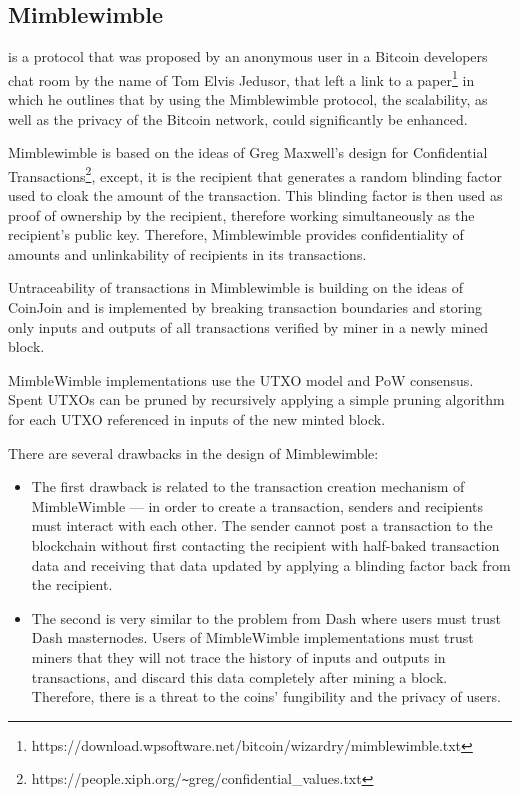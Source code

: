 \documentclass[8pt,fleqn,openany]{book}
\begin{document}
{\subsection{Mimblewimble} is a protocol that was proposed by an anonymous user in a Bitcoin developers chat room by the name of Tom Elvis Jedusor, that left a link to a paper\footnote{https://download.wpsoftware.net/bitcoin/wizardry/mimblewimble.txt} in which he outlines that by using the Mimblewimble protocol, the scalability, as well as the privacy of the Bitcoin network, could significantly be enhanced.

Mimblewimble is based on the ideas of Greg Maxwell’s design for Confidential Transactions\footnote{https://people.xiph.org/\texttt{\~}greg/confidential\_values.txt}, except, it is the recipient that generates a random blinding factor used to cloak the amount of the transaction. This blinding factor is then used as proof of ownership by the recipient, therefore working simultaneously as the recipient’s public key. Therefore, Mimblewimble provides confidentiality of amounts and unlinkability of recipients in its transactions.

Untraceability of transactions in Mimblewimble is building on the ideas of CoinJoin and is implemented by breaking transaction boundaries and storing only inputs and outputs of all transactions verified by miner in a newly mined block.

MimbleWimble implementations use the UTXO model and PoW consensus. Spent UTXOs can be pruned by recursively applying a simple pruning algorithm for each UTXO referenced in inputs of the new minted block.

There are several drawbacks in the design of Mimblewimble:

\begin{itemize}
  \item {The first drawback is related to the transaction creation mechanism of MimbleWimble — in order to create a transaction, senders and recipients must interact with each other. The sender cannot post a transaction to the blockchain without first contacting the recipient with half-baked transaction data and receiving that data updated by applying a blinding factor back from the recipient.}
  \item {The second is very similar to the problem from Dash where users must trust Dash masternodes. Users of MimbleWimble implementations must trust miners that they will not trace the history of inputs and outputs in transactions, and discard this data completely after mining a block. Therefore, there is a threat to the coins’ fungibility and the privacy of users.}
\end{itemize}


}
\end{document}
